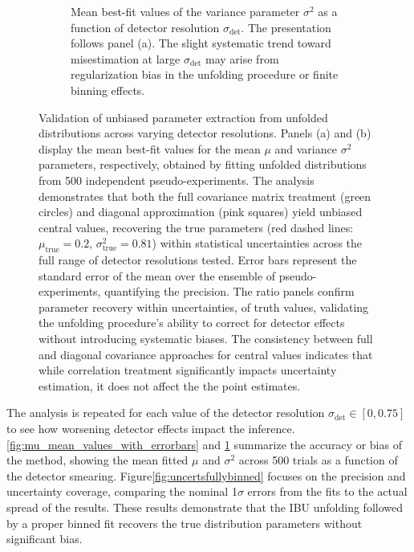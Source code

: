 \begin{figure}
\begin{subfigure}[t]{0.48\textwidth}
        \caption{Mean best-fit values of the variance parameter $\sigma^2$ as a function of detector resolution $\sigma_{\text{det}}$. The presentation follows panel (a). The slight systematic trend toward misestimation at large $\sigma_{\text{det}}$ may arise from regularization bias in the unfolding procedure or finite binning effects.}
        \label{fig:var_mean_values_with_errorbars}
    \end{subfigure}
    \caption[Validation of unbiased parameter extraction from unfolded distributions across varying detector resolutions.]{Validation of unbiased parameter extraction from unfolded distributions across varying detector resolutions. Panels (a) and (b) display the mean best-fit values for the mean $\mu$ and variance $\sigma^2$ parameters, respectively, obtained by fitting unfolded distributions from 500 independent pseudo-experiments. The analysis demonstrates that both the full covariance matrix treatment (green circles) and diagonal approximation (pink squares) yield unbiased central values, recovering the true parameters (red dashed lines: $\mu_{\text{true}} = 0.2$, $\sigma^2_{\text{true}} = 0.81$) within statistical uncertainties across the full range of detector resolutions tested.
    Error bars represent the standard error of the mean over the ensemble of pseudo-experiments, quantifying the precision. The ratio panels confirm parameter recovery within uncertainties, of truth values, validating the unfolding procedure's ability to correct for detector effects without introducing systematic biases. The consistency between full and diagonal covariance approaches for central values indicates that while correlation treatment significantly impacts uncertainty estimation, it does not affect the the point estimates.
    }
    \label{fig:centralvaluesfullybinned}
\end{figure}
            The analysis is repeated for each value of the detector resolution $\sigma_{\text{det}}\in[0, 0.75]$ to see how worsening detector effects impact the inference.
            \cref{fig:mu_mean_values_with_errorbars} and \cref{fig:var_mean_values_with_errorbars} summarize the accuracy or bias of the method, showing the mean fitted $\mu$ and $\sigma^2$ across 500 trials as a function of the detector smearing.
            Figure\ref{fig:uncertsfullybinned} focuses on the precision and uncertainty coverage, comparing the nominal 1$\sigma$ errors from the fits to the actual spread of the results.
            These results demonstrate that the IBU unfolding followed by a proper binned fit recovers the true distribution parameters without significant bias.
